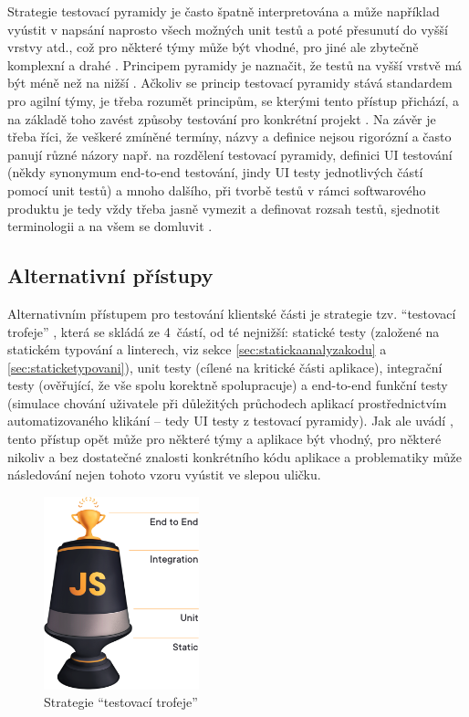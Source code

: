 Strategie testovací pyramidy je často špatně interpretována a může například vyústit v napsání naprosto všech možných unit testů a poté přesunutí do vyšší vrstvy atd., což pro některé týmy může být vhodné, pro jiné ale zbytečně komplexní a drahé \cite{test-cucumber2}. Principem pyramidy je naznačit, že testů na vyšší vrstvě má být méně než na nižší \cite{test-cucumber2}. Ačkoliv se princip testovací pyramidy stává standardem pro agilní týmy, je třeba rozumět principům, se kterými tento přístup přichází, a na základě toho zavést způsoby testování pro konkrétní projekt \cite{test-cucumber2}. Na závěr je třeba říci, že veškeré zmíněné termíny, názvy a definice nejsou rigorózní a často panují různé názory např. na rozdělení testovací pyramidy, definici UI testování (někdy synonymum end-to-end testování, jindy UI testy jednotlivých částí pomocí unit testů) a mnoho dalšího, při tvorbě testů v rámci softwarového produktu je tedy vždy třeba jasně vymezit a definovat rozsah testů, sjednotit terminologii a na všem se domluvit \cite{test-fowler}.

\subsection{Alternativní přístupy}\label{subsec:testingtrophy}

Alternativním přístupem pro testování klientské části je strategie tzv. \enquote{testovací trofeje} \cite{test-trophy}, která se skládá ze 4~částí, od té nejnižší: statické testy (založené na statickém typování a linterech, viz sekce \ref{sec:statickaanalyzakodu} a \ref{sec:staticketypovani}), unit testy (cílené na kritické části aplikace), integrační testy (ověřující, že vše spolu korektně spolupracuje) a end-to-end funkční testy (simulace chování uživatele při důležitých průchodech aplikací prostřednictvím automatizovaného klikání -- tedy UI testy z testovací pyramidy). Jak ale uvádí \cite{test-roth}, tento přístup opět může pro některé týmy a aplikace být vhodný, pro některé nikoliv a bez dostatečné znalosti konkrétního kódu aplikace a problematiky může následování nejen tohoto vzoru vyústit ve slepou uličku.

\begin{figure}[h]\centering
	\includegraphics[width=0.4\textwidth]{img/ext/testing_trophy.png}
	\caption[Strategie \enquote{testovací trofeje}]{Strategie \enquote{testovací trofeje} \cite{test-trophy}}\label{fig:testing_trophy}
\end{figure}

